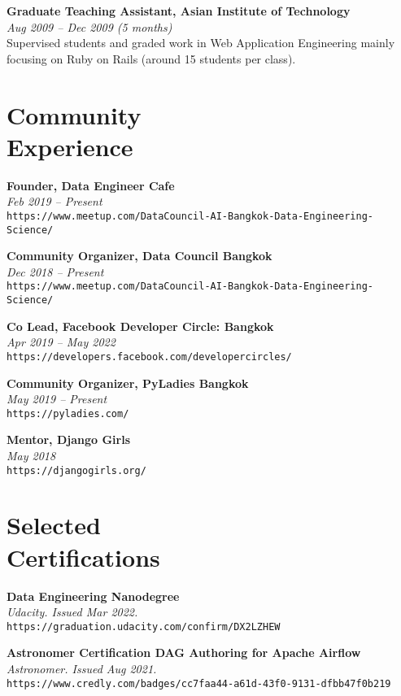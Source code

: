\documentclass[margin, 10pt]{res}
\begin{document}
\begin{resume}
{\bf Graduate Teaching Assistant, Asian Institute of Technology}\\
{\it \small Aug 2009 -- Dec 2009 (5 months)}\\
Supervised students and graded work in Web Application Engineering mainly focusing
on Ruby on Rails (around 15 students per class).

\section{Community \\ Experience}

{\bf Founder, Data Engineer Cafe}\\
{\it \small Feb 2019 -- Present}\\
{\tt https://www.meetup.com/DataCouncil-AI-Bangkok-Data-Engineering-Science/}

{\bf Community Organizer, Data Council Bangkok}\\
{\it \small Dec 2018 -- Present}\\
{\tt https://www.meetup.com/DataCouncil-AI-Bangkok-Data-Engineering-Science/}

{\bf Co Lead, Facebook Developer Circle: Bangkok}\\
{\it \small Apr 2019 -- May 2022}\\
{\tt https://developers.facebook.com/developercircles/}

{\bf Community Organizer, PyLadies Bangkok}\\
{\it \small May 2019 -- Present}\\
{\tt https://pyladies.com/}

{\bf Mentor, Django Girls}\\
{\it \small May 2018}\\
{\tt https://djangogirls.org/}

\section{Selected \\ Certifications}

{\bf Data Engineering Nanodegree}\\
{\it \small Udacity. Issued Mar 2022.}\\
{\tt https://graduation.udacity.com/confirm/DX2LZHEW}

{\bf Astronomer Certification DAG Authoring for Apache Airflow}\\
{\it \small Astronomer. Issued Aug 2021.}\\
{\tt https://www.credly.com/badges/cc7faa44-a61d-43f0-9131-dfbb47f0b219}


\end{resume}
\end{document}
